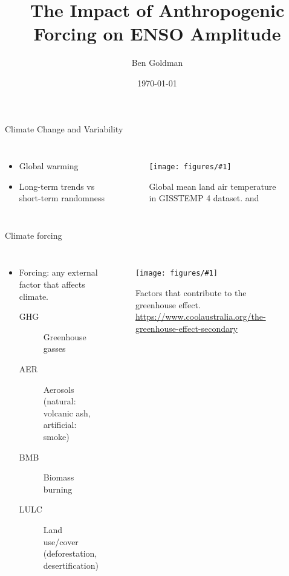 \documentclass{beamer}
\title{The Impact of Anthropogenic Forcing on ENSO Amplitude}
\author{Ben Goldman}
\date{\today}
\newcommand{\myfig}[3]{
  \begin{figure}
    \centering
    \texttt{[image: figures/\#1]}
    \caption{#2}
    \label{fig:#3}
  \end{figure}
}
\begin{document}
\maketitle


\begin{frame}{Climate Change and Variability}
  \begin{columns}
    \begin{itemize}
    \item Global warming
    \item Long-term trends vs short-term randomness
    \end{itemize}
    \myfig{intro_fig_3.pdf}{Global mean land air temperature in GISSTEMP 4 dataset. \citep{gistemp2019giss} and \citep{lenssen2019improvements}}{this}
  \end{columns}
\end{frame}

\begin{frame}{Climate forcing}
  \begin{columns}
    \begin{itemize}
    \item \alert{Forcing}: any external factor that affects climate.
      \begin{description}
      \item[\alert{GHG}] Greenhouse gasses
      \item[\alert{AER}] Aerosols (natural: volcanic ash, artificial: smoke)
      \item[\alert{BMB}] Biomass burning
      \item[\alert{LULC}] Land use/cover (deforestation, desertification)
      \end{description}
    \end{itemize}
    \myfig{greenhouse_Effect.jpg}{Factors that contribute to the greenhouse effect. \url{https://www.coolaustralia.org/the-greenhouse-effect-secondary}}{this}
  \end{columns}
\end{frame}
\end{document}
